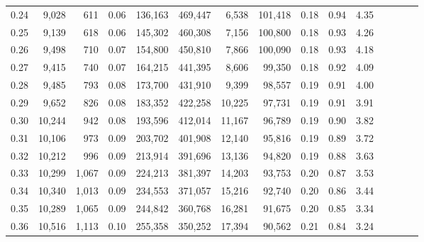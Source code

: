 \begin{tabular}{rrrcrrrrrrrrrrr}
0.24 &   9,028 &    611 &                                       0.06 &  136,163 &  469,447 &    6,538 &  101,418 &  0.18 &  0.94 &                         4.35 \\
0.25 &   9,139 &    618 &                                       0.06 &  145,302 &  460,308 &    7,156 &  100,800 &  0.18 &  0.93 &                         4.26 \\
0.26 &   9,498 &    710 &                                       0.07 &  154,800 &  450,810 &    7,866 &  100,090 &  0.18 &  0.93 &                         4.18 \\
0.27 &   9,415 &    740 &                                       0.07 &  164,215 &  441,395 &    8,606 &   99,350 &  0.18 &  0.92 &                         4.09 \\
0.28 &   9,485 &    793 &                                       0.08 &  173,700 &  431,910 &    9,399 &   98,557 &  0.19 &  0.91 &                         4.00 \\
0.29 &   9,652 &    826 &                                       0.08 &  183,352 &  422,258 &   10,225 &   97,731 &  0.19 &  0.91 &                         3.91 \\
0.30 &  10,244 &    942 &                                       0.08 &  193,596 &  412,014 &   11,167 &   96,789 &  0.19 &  0.90 &                         3.82 \\
0.31 &  10,106 &    973 &                                       0.09 &  203,702 &  401,908 &   12,140 &   95,816 &  0.19 &  0.89 &                         3.72 \\
0.32 &  10,212 &    996 &                                       0.09 &  213,914 &  391,696 &   13,136 &   94,820 &  0.19 &  0.88 &                         3.63 \\
0.33 &  10,299 &  1,067 &                                       0.09 &  224,213 &  381,397 &   14,203 &   93,753 &  0.20 &  0.87 &                         3.53 \\
0.34 &  10,340 &  1,013 &                                       0.09 &  234,553 &  371,057 &   15,216 &   92,740 &  0.20 &  0.86 &                         3.44 \\
0.35 &  10,289 &  1,065 &                                       0.09 &  244,842 &  360,768 &   16,281 &   91,675 &  0.20 &  0.85 &                         3.34 \\
0.36 &  10,516 &  1,113 &                                       0.10 &  255,358 &  350,252 &   17,394 &   90,562 &  0.21 &  0.84 &                         3.24 \\

\end{tabular}
